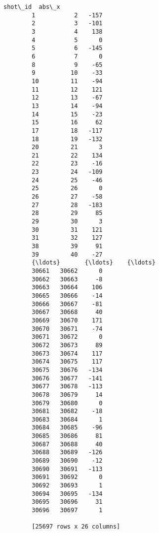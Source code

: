 \documentclass[11pt]{article}
\begin{document}
\begin{Verbatim}[commandchars=\\\{\}]
              shot\_id  abs\_x  
        1           2   -157  
        2           3   -101  
        3           4    138  
        4           5      0  
        5           6   -145  
        6           7      0  
        8           9    -65  
        9          10    -33  
        10         11    -94  
        11         12    121  
        12         13    -67  
        13         14    -94  
        14         15    -23  
        15         16     62  
        17         18   -117  
        18         19   -132  
        20         21      3  
        21         22    134  
        22         23    -16  
        23         24   -109  
        24         25    -46  
        25         26      0  
        26         27    -58  
        27         28   -183  
        28         29     85  
        29         30      3  
        30         31    121  
        31         32    127  
        38         39     91  
        39         40    -27  
        {\ldots}       {\ldots}    {\ldots}  
        30661   30662      0  
        30662   30663     -8  
        30663   30664    106  
        30665   30666    -14  
        30666   30667    -81  
        30667   30668     40  
        30669   30670    171  
        30670   30671    -74  
        30671   30672      0  
        30672   30673     89  
        30673   30674    117  
        30674   30675    117  
        30675   30676   -134  
        30676   30677   -141  
        30677   30678   -113  
        30678   30679     14  
        30679   30680      0  
        30681   30682    -18  
        30683   30684      1  
        30684   30685    -96  
        30685   30686     81  
        30687   30688     40  
        30688   30689   -126  
        30689   30690    -12  
        30690   30691   -113  
        30691   30692      0  
        30692   30693      1  
        30694   30695   -134  
        30695   30696     31  
        30696   30697      1  
        
        [25697 rows x 26 columns]
\end{Verbatim}
            
\end{document}
